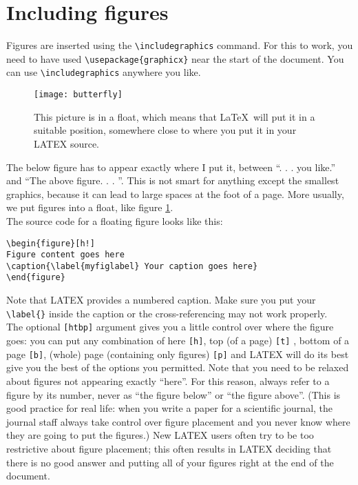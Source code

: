 \section{Including figures}

Figures are inserted using the \verb|\includegraphics| command. For this to work, you need to have used \verb|\usepackage{graphicx}| near the start of the document. You can use \verb|\includegraphics| anywhere you like. \\

\begin{figure}[htb]
    \noindent\hrulefill
	\centering
	\caption{This picture is in a float, which means that \LaTeX \ will put it in a suitable position, somewhere close to where you put it in your LATEX source.}
	\texttt{[image: butterfly]}
	\label{butterflyCenter}\par
    \hrulefill
\end{figure}

The below figure has to appear exactly where I put it, between “. . . you like.” and “The above figure. . . ”. This is not smart for anything except the smallest graphics, because it can lead to large spaces at the foot of a page. More usually, we put figures into a float, like figure \ref{butterflyCenter}. \\

The source code for a floating figure looks like this:

\begin{lstlisting}
\begin{figure}[h!] 
Figure content goes here 
\caption{\label{myfiglabel} Your caption goes here} 
\end{figure}
\end{lstlisting}

Note that LATEX provides a numbered caption. Make sure you put your \verb|\label{}| inside the caption or the cross-referencing may not work properly. \\

The optional \verb|[htbp]| argument gives you a little control over where the figure goes: you can put any combination of here \verb|[h]|, top (of a page) \verb|[t]| , bottom of a page \verb|[b]|, (whole) page (containing only figures) \verb|[p]| and LATEX will do its best give you the best of the options you permitted. Note that you need to be relaxed about figures not appearing exactly “here”. For this reason, always refer to a figure by its number, never as “the figure below” or “the figure above”. (This is good practice for real life: when you write a paper for a scientific journal, the journal staff always take control over figure placement and you never know where they are going to put the figures.) New LATEX users often try to be too restrictive about figure placement; this often results in LATEX deciding that there is no good answer and putting all of your figures right at the end of the document. \\

